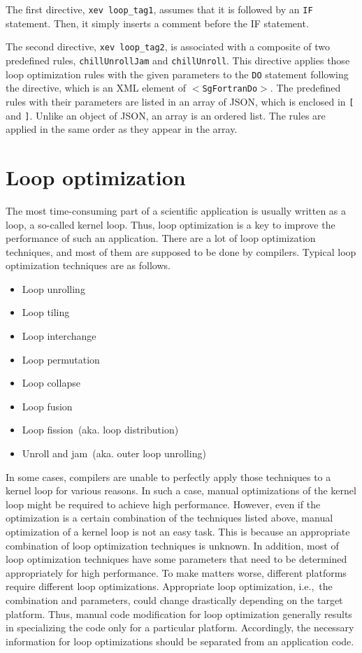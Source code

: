 The first directive, \texttt{xev loop\_tag1}, assumes that it is
followed by an \texttt{IF} statement. Then, it simply inserts a comment
before the IF statement.

The second directive, \texttt{xev loop\_tag2}, is associated with a
composite of two predefined rules, \texttt{chillUnrollJam} and
\texttt{chillUnroll}.  This directive applies those loop optimization
rules with the given parameters to the \texttt{DO} statement following
the directive, which is an XML element of \texttt{$<$SgFortranDo$>$}.  The
predefined rules with their parameters are listed in an array of JSON,
which is enclosed in \texttt{[} and \texttt{]}. Unlike an object of
JSON, an array is an ordered list. The rules are applied in the same
order as they appear in the array.

\section{Loop optimization}
The most time-consuming part of a scientific application is usually
written as a loop, a so-called kernel loop.  Thus, loop optimization is
a key to improve the performance of such an application.  There are a
lot of loop optimization techniques, and most of them are supposed to be
done by compilers. Typical loop optimization techniques are as follows.
\begin{itemize}
 \item Loop unrolling
 \item Loop tiling
 \item Loop interchange
 \item Loop permutation
 \item Loop collapse
 \item Loop fusion
 \item Loop fission~(aka. loop distribution)
 \item Unroll and jam~(aka. outer loop unrolling)
\end{itemize}

In some cases, compilers are unable to perfectly apply those techniques
to a kernel loop for various reasons.  In such a case, manual
optimizations of the kernel loop might be required to achieve high
performance. However, even if the optimization is a certain combination
of the techniques listed above, manual optimization of a kernel loop is
not an easy task. This is because an appropriate combination of loop
optimization techniques is unknown.  In addition, most of loop
optimization techniques have some parameters that need to be determined
appropriately for high performance.  To make matters worse, different
platforms require different loop optimizations.  Appropriate loop
optimization, i.e.,~the combination and parameters, could change
drastically depending on the target platform.  Thus, manual code
modification for loop optimization generally results in specializing the
code only for a particular platform. Accordingly, the necessary
information for loop optimizations should be separated from an
application code.

